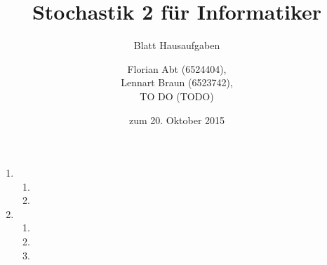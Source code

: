 \documentclass[a4paper]{scrartcl}
\title{Stochastik 2 für Informatiker}
\subtitle{Blatt \blattnr Hausaufgaben}
\author{
    Florian Abt (6524404), \\
    Lennart Braun (6523742), \\
    TO DO (TODO)
}
\date{zum 20. Oktober 2015}
\begin{document}
\maketitle

\begin{enumerate}[label=\bfseries 1.\arabic*]
    \item
        \begin{enumerate}[label=\alph*)]
            \item

            \item

        \end{enumerate}

    \item
        \begin{enumerate}[label=\alph*)]
            \item

            \item

            \item

        \end{enumerate}


\end{enumerate}
\end{document}
